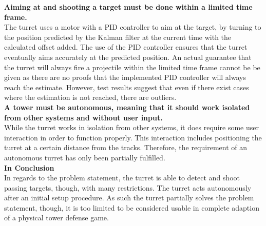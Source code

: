 \textbf{Aiming at and shooting a target must be done within a limited time frame.} \\
The turret uses a motor with a PID controller to aim at the target, by turning to the position predicted by the Kalman filter at the current time with the calculated offset added. The use of the PID controller ensures that the turret eventually aims accurately at the predicted position. An actual guarantee that the turret will always fire a projectile within the limited time frame cannot be be given as there are no proofs that the implemented PID controller will always reach the estimate. However, test results suggest that even if there exist cases where the estimation is not reached, there are outliers. \\


\textbf{A tower must be autonomous, meaning that it should work isolated from other systems and without user input.} \\
While the turret works in isolation from other systems, it does require some user interaction in order to function properly. This interaction includes positioning the turret at a certain distance from the tracks. Therefore, the requirement of an autonomous turret has only been partially fulfilled. \\

\textbf{In Conclusion}\\
In regards to the problem statement, the turret is able to detect and shoot passing targets, though, with many restrictions. The turret acts autonomously after an initial setup procedure. As such the turret partially solves the problem statement, though, it is too limited to be considered usable in complete adaption of a physical tower defense game. \\


